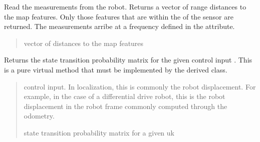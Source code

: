 \documentclass[letterpaper,10pt,english]{sphinxmanual}
\begin{document}
\begin{fulllineitems}
\begin{fulllineitems}
\label{\detokenize{GridLocalization:GL_4DOFAUV.GL_4DOFAUV.GetMeasurements}}
\pysigstartsignatures
{}
\pysigstopsignatures
\sphinxAtStartPar
Read the measurements from the robot. Returns a vector of range distances to the map features.
Only those features that are within the  of the sensor are returned.
The measurements arribe at a frequency defined in the  attribute.
\begin{quote}\begin{description}
\sphinxAtStartPar
vector of distances to the map features

\end{description}\end{quote}

\end{fulllineitems}


\begin{fulllineitems}
\label{\detokenize{GridLocalization:GL_4DOFAUV.GL_4DOFAUV.StateTransitionProbability_4_uk}}
\pysigstartsignatures
{}
\pysigstopsignatures
\sphinxAtStartPar
Returns the state transition probability matrix for the given control input .
This is a pure virtual method that must be implemented by the derived class.
\begin{quote}\begin{description}
\sphinxAtStartPar
{} \textendash{} control input. In localization, this is commonly the robot displacement. For example, in the case of a differential drive robot, this is the robot displacement in the robot frame commonly computed through the odometry.

\sphinxAtStartPar
{} state transition probability matrix for a given uk

\end{description}\end{quote}


\end{fulllineitems}
\end{fulllineitems}
\end{document}
